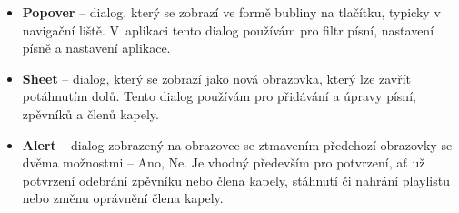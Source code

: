 \begin{itemize}
    \item \textbf{Popover} -- dialog, který se zobrazí ve formě bubliny na tlačítku, typicky v navigační liště. V~aplikaci tento dialog používám pro filtr písní, nastavení písně a nastavení aplikace.
    \item \textbf{Sheet} -- dialog, který se zobrazí jako nová obrazovka, který lze zavřít potáhnutím dolů. Tento dialog používám pro přidávání a úpravy písní, zpěvníků a členů kapely.
    \item \textbf{Alert} -- dialog zobrazený na obrazovce se ztmavením předchozí obrazovky se dvěma možnost\-mi -- Ano, Ne. Je vhodný především pro potvrzení, ať už potvrzení odebrání zpěvníku nebo člena kapely, stáhnutí či nahrání playlistu nebo změnu oprávnění člena kapely.
\end{itemize}

